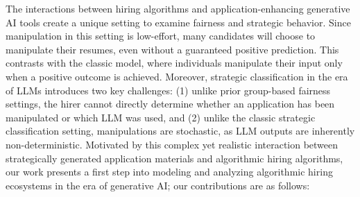 The interactions between hiring algorithms and application-enhancing generative AI tools create a unique setting to examine fairness and strategic behavior. Since manipulation in this setting is low-effort, many candidates will choose to manipulate their resumes, even without a guaranteed positive prediction. This contrasts with the classic model, where individuals manipulate their input only when a positive outcome is achieved.
Moreover, strategic classification in the era of LLMs introduces two key challenges: (1) unlike prior group-based fairness settings, the hirer cannot directly determine whether an application has been manipulated or which LLM was used, and (2) unlike the classic strategic classification setting, manipulations are stochastic, as LLM outputs are inherently non-deterministic. Motivated by this complex yet realistic interaction between strategically generated application materials and algorithmic hiring algorithms, our work presents a first step into modeling and analyzing algorithmic hiring ecosystems in the era of generative AI; our contributions are as follows: 
